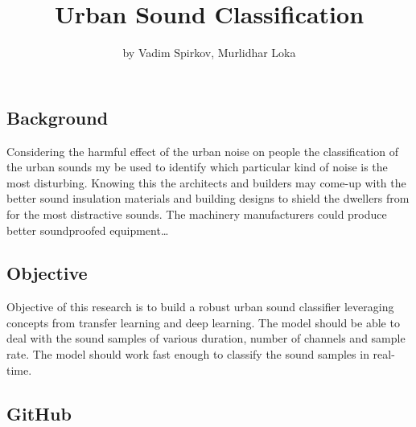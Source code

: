 \title{Urban Sound Classification}
\author{by Vadim Spirkov, Murlidhar Loka}

\maketitle



\hypertarget{background}{%
\subsection{Background}\label{background}}

Considering the harmful effect of the urban noise on people the
classification of the urban sounds my be used to identify which
particular kind of noise is the most disturbing. Knowing this the
architects and builders may come-up with the better sound insulation
materials and building designs to shield the dwellers from for the most
distractive sounds. The machinery manufacturers could produce better
soundproofed equipment\ldots{}

\hypertarget{objective}{%
\subsection{Objective}\label{objective}}

Objective of this research is to build a robust urban sound classifier
leveraging concepts from transfer learning and deep learning. The model
should be able to deal with the sound samples of various duration,
number of channels and sample rate. The model should work fast enough to
classify the sound samples in real-time.

\hypertarget{github}{%
\subsection{GitHub}\label{github}}


